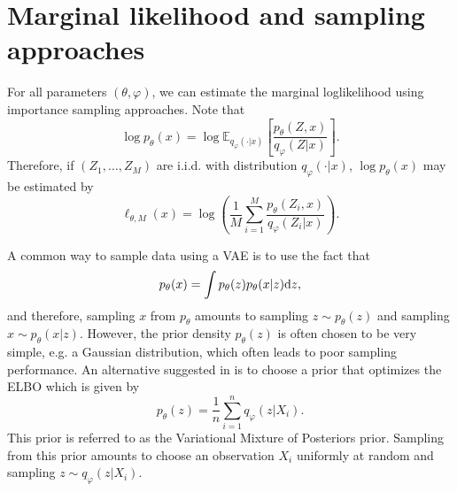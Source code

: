 \documentclass[english,graybox,envcountchap,envcountsame,sectrefs,shortlabels]{svmono}
\theoremstyle{style}
\newcommand{\eqsp}{}
\begin{document}
\section{Marginal likelihood and sampling approaches}
 For all parameters $(\theta,\varphi)$, we can estimate the marginal loglikelihood using  importance sampling approaches. Note that
$$
\log p_\theta(x) = \log \mathbb{E}_{q_{\varphi}(\cdot|x)}\left[\frac{p_\theta(Z,x)}{q_{\varphi}(Z|x)}\right]\eqsp.
$$
Therefore, if $(Z_1,\ldots,Z_M)$ are i.i.d. with distribution $q_{\varphi}(\cdot|x)$, $\log p_\theta(x) $ may be estimated by
$$
\ell_{\theta,M}(x) = \log\left(\frac{1}{M}\sum_{i=1}^M\frac{p_\theta(Z_i,x)}{q_{\varphi}(Z_i|x)}\right)\eqsp.
$$

 A common way to sample data using a VAE is to use the fact that 
$$
p_\theta(x) = \int p_\theta(z)p_\theta(x|z)\rmd z\eqsp,
$$
and therefore, sampling $x$ from $p_\theta$ amounts to sampling $z\sim p_\theta(z)$ and sampling $x\sim p_\theta(x|z)$.  However, the prior density $p_\theta(z)$ is often chosen to be very simple, e.g. a Gaussian distribution, which often leads to poor sampling performance. An alternative suggested in \cite{tomczak2018vae} is to choose  a prior that optimizes the ELBO which is given by 
$$
p_\theta(z) = \frac{1}{n}\sum_{i=1}^nq_{\varphi}(z|X_i)\eqsp.
$$
This prior is referred to as the Variational Mixture of Posteriors prior. Sampling from this prior amounts to choose an observation $X_i$ uniformly at random and sampling $z\sim  q_{\varphi}(z|X_i)$.
\end{document}
